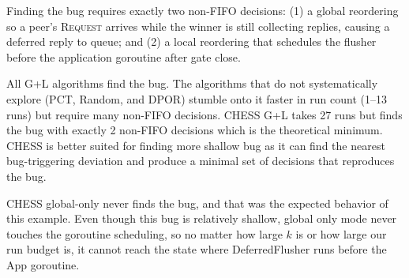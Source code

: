 \documentclass[11pt]{article}
\begin{document}
Finding the bug requires exactly two non-FIFO decisions: (1) a global reordering so a peer's \textsc{Request} arrives while the winner is still collecting replies, causing a deferred reply to queue; and (2) a local reordering that schedules the flusher before the application goroutine after gate close.


\begin{table}[h]
\centering
\caption{ra-gate benchmark results (20 attempts). All algorithms other than CHESS global only find the bug as they explore global + local interleavings, but differ in how many non-FIFO decisions their bug-finding traces contain. CHESS global-only cannot find the bug regardless of run budget.}
\label{tab:ra-gate}

\end{table}

All G+L algorithms find the bug. The algorithms that do not systematically explore (PCT, Random, and DPOR) stumble onto it faster in run count (1--13 runs) but require many non-FIFO decisions. CHESS G+L takes 27 runs but finds the bug with exactly 2 non-FIFO decisions which is the theoretical minimum. CHESS is better suited for finding more shallow bug as it can find the nearest bug-triggering deviation and produce a minimal set of decisions that reproduces the bug. 

CHESS global-only never finds the bug, and that was the expected behavior of this example. Even though this bug is relatively shallow, global only mode never touches the goroutine scheduling, so no matter how large $k$ is or how large our run budget is, it cannot reach the state where DeferredFlusher runs before the App goroutine.
\end{document}
